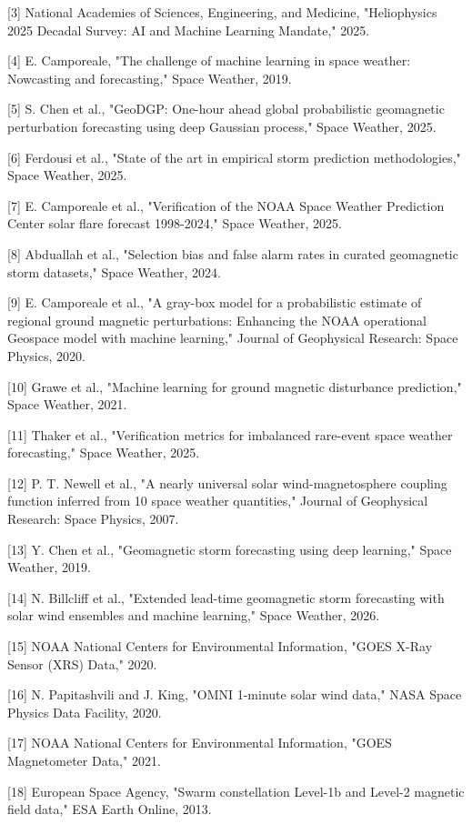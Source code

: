 \documentclass[conference]{IEEEtran}
\begin{document}
[3] National Academies of Sciences, Engineering, and Medicine, "Heliophysics 2025 Decadal Survey: AI and Machine Learning Mandate," 2025.

[4] E. Camporeale, "The challenge of machine learning in space weather: Nowcasting and forecasting," Space Weather, 2019.

[5] S. Chen et al., "GeoDGP: One-hour ahead global probabilistic geomagnetic perturbation forecasting using deep Gaussian process," Space Weather, 2025.

[6] Ferdousi et al., "State of the art in empirical storm prediction methodologies," Space Weather, 2025.

[7] E. Camporeale et al., "Verification of the NOAA Space Weather Prediction Center solar flare forecast 1998-2024," Space Weather, 2025.

[8] Abduallah et al., "Selection bias and false alarm rates in curated geomagnetic storm datasets," Space Weather, 2024.

[9] E. Camporeale et al., "A gray-box model for a probabilistic estimate of regional ground magnetic perturbations: Enhancing the NOAA operational Geospace model with machine learning," Journal of Geophysical Research: Space Physics, 2020.

[10] Grawe et al., "Machine learning for ground magnetic disturbance prediction," Space Weather, 2021.

[11] Thaker et al., "Verification metrics for imbalanced rare-event space weather forecasting," Space Weather, 2025.

[12] P. T. Newell et al., "A nearly universal solar wind-magnetosphere coupling function inferred from 10 space weather quantities," Journal of Geophysical Research: Space Physics, 2007.

[13] Y. Chen et al., "Geomagnetic storm forecasting using deep learning," Space Weather, 2019.

[14] N. Billcliff et al., "Extended lead-time geomagnetic storm forecasting with solar wind ensembles and machine learning," Space Weather, 2026.

[15] NOAA National Centers for Environmental Information, "GOES X-Ray Sensor (XRS) Data," 2020.

[16] N. Papitashvili and J. King, "OMNI 1-minute solar wind data," NASA Space Physics Data Facility, 2020.

[17] NOAA National Centers for Environmental Information, "GOES Magnetometer Data," 2021.

[18] European Space Agency, "Swarm constellation Level-1b and Level-2 magnetic field data," ESA Earth Online, 2013.
\end{document}
